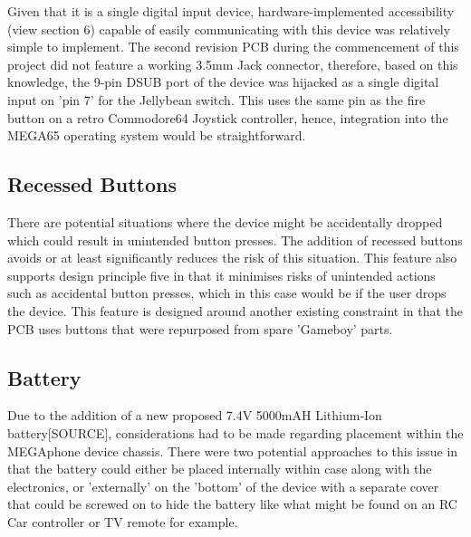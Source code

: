 Given that it is a single digital input device, hardware-implemented accessibility (view section 6) capable of easily communicating with this device was relatively simple to implement. 
The second revision PCB during the commencement of this project did not feature a working 3.5mm Jack connector, therefore, based on this knowledge, the 9-pin DSUB port of the device was hijacked as a single digital input on 'pin 7' for the Jellybean switch. 
This uses the same pin as the fire button on a retro Commodore64 Joystick controller, hence, integration into the MEGA65 operating system would be straightforward.

\subsection{Recessed Buttons}

There are potential situations where the device might be accidentally dropped which could result in unintended button presses.
The addition of recessed buttons avoids or at least significantly reduces the risk of this situation.
This feature also supports design principle five in that it minimises risks of unintended actions such as accidental button presses, which in this case would be if the user drops the device.
This feature is designed around another existing constraint in that the PCB uses buttons that were repurposed from spare 'Gameboy' parts. %

\subsection{Battery}

Due to the addition of a new proposed 7.4V 5000mAH Lithium-Ion battery[SOURCE], considerations had to be made regarding placement within the MEGAphone device chassis.
There were two potential approaches to this issue in that the battery could either be placed internally within case along with the electronics, or 'externally' on the 'bottom' of the device with a separate cover that could be screwed on to hide the battery like what might be found on an RC Car controller or TV remote for example.

